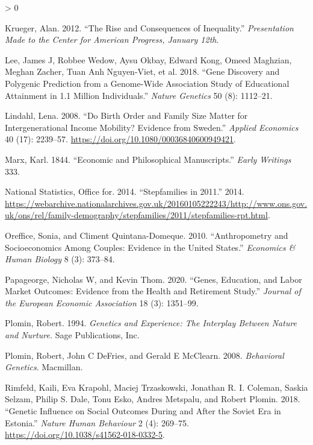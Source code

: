 \documentclass[
]{article}
\newlength{\cslhangindent}
\newenvironment{CSLReferences}[2] %
 {%
  \setlength{\parindent}{0pt}
  \ifodd #1 \everypar{\setlength{\hangindent}{\cslhangindent}}\ignorespaces\fi
  \ifnum #2 > 0
  \setlength{\parskip}{#2\baselineskip}
  \fi
 }%
 {}
\begin{document}
\begin{CSLReferences}{1}{0}
\leavevmode\hypertarget{ref-krueger2012rise}{}%
Krueger, Alan. 2012. {``The Rise and Consequences of Inequality.''} \emph{Presentation Made to the Center for American Progress, January 12th}.

\leavevmode\hypertarget{ref-lee2018gene}{}%
Lee, James J, Robbee Wedow, Aysu Okbay, Edward Kong, Omeed Maghzian, Meghan Zacher, Tuan Anh Nguyen-Viet, et al. 2018. {``Gene Discovery and Polygenic Prediction from a Genome-Wide Association Study of Educational Attainment in 1.1 Million Individuals.''} \emph{Nature Genetics} 50 (8): 1112--21.

\leavevmode\hypertarget{ref-Lindahl_2008}{}%
Lindahl, Lena. 2008. {``Do Birth Order and Family Size Matter for Intergenerational Income Mobility? Evidence from Sweden.''} \emph{Applied Economics} 40 (17): 2239--57. \url{https://doi.org/10.1080/00036840600949421}.

\leavevmode\hypertarget{ref-marx1844economic}{}%
Marx, Karl. 1844. {``Economic and Philosophical Manuscripts.''} \emph{Early Writings} 333.

\leavevmode\hypertarget{ref-ons2011stepfamilies}{}%
National Statistics, Office for. 2014. {``Stepfamilies in 2011.''} 2014. \url{https://webarchive.nationalarchives.gov.uk/20160105222243/http://www.ons.gov.uk/ons/rel/family-demography/stepfamilies/2011/stepfamilies-rpt.html}.

\leavevmode\hypertarget{ref-oreffice2010anthropometry}{}%
Oreffice, Sonia, and Climent Quintana-Domeque. 2010. {``Anthropometry and Socioeconomics Among Couples: Evidence in the United States.''} \emph{Economics \& Human Biology} 8 (3): 373--84.

\leavevmode\hypertarget{ref-papageorge2020genes}{}%
Papageorge, Nicholas W, and Kevin Thom. 2020. {``Genes, Education, and Labor Market Outcomes: Evidence from the Health and Retirement Study.''} \emph{Journal of the European Economic Association} 18 (3): 1351--99.

\leavevmode\hypertarget{ref-plomin1994genetics}{}%
Plomin, Robert. 1994. \emph{Genetics and Experience: The Interplay Between Nature and Nurture.} Sage Publications, Inc.

\leavevmode\hypertarget{ref-plomin2008behavioral}{}%
Plomin, Robert, John C DeFries, and Gerald E McClearn. 2008. \emph{Behavioral Genetics}. Macmillan.

\leavevmode\hypertarget{ref-Rimfeld_2018}{}%
Rimfeld, Kaili, Eva Krapohl, Maciej Trzaskowski, Jonathan R. I. Coleman, Saskia Selzam, Philip S. Dale, Tonu Esko, Andres Metspalu, and Robert Plomin. 2018. {``Genetic Influence on Social Outcomes During and After the Soviet Era in Estonia.''} \emph{Nature Human Behaviour} 2 (4): 269--75. \url{https://doi.org/10.1038/s41562-018-0332-5}.


\end{CSLReferences}
\end{document}

